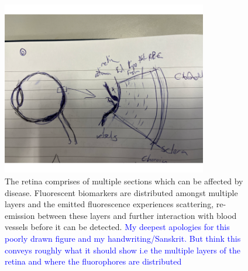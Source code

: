 \documentclass{optica-article}
\begin{document}
\begin{figure}
    \centering
    \includegraphics[width = 0.8\textwidth]{Figures/EyeStructure.png}
    \caption{The retina comprises of multiple sections which can be affected by disease. Fluorescent biomarkers are distributed amongst multiple layers and the emitted fluorescence experiences scattering, re-emission between these layers and further interaction with blood vessels before it can be detected.
    \textcolor{blue}{My deepest apologies for this poorly drawn figure and my handwriting/Sanskrit. But think this conveys roughly what it should show i.e the multiple layers of the retina and where the fluorophores are distributed}}
    \label{fig:eyestructure}
\end{figure}
\end{document}
